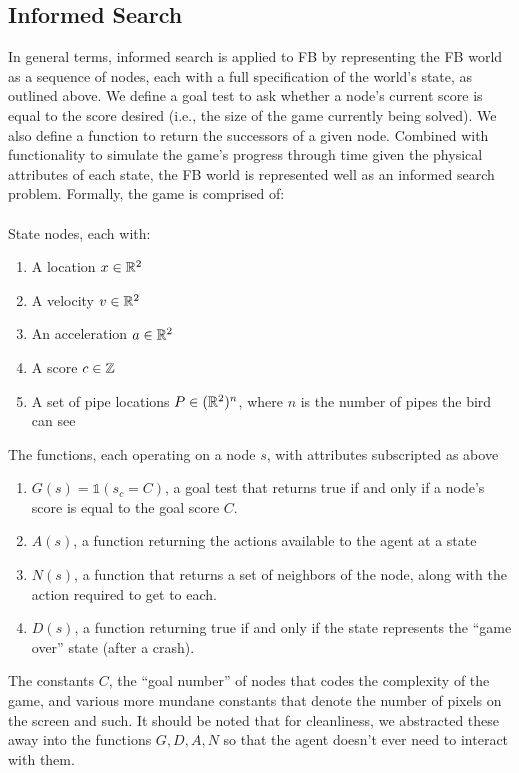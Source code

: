 \documentclass[11pt]{article}
\begin{document}
\subsection{Informed Search}
In general terms, informed search is applied to FB by representing the FB
world as a sequence of nodes, each with a full specification of the world's state,
as outlined above. We define a goal test to ask whether a node's current score
is equal to the score desired (i.e., the size of the game currently being solved).
We also define a function to return the successors of a given node. Combined with
functionality to simulate the game's progress through time given the physical
attributes of each state, the FB world is represented well as an informed
search problem. Formally, the game is comprised of:
\\\\State nodes, each with:
\begin{enumerate}
    \item A location $x \in \mathbb{R}^2$
    \item A velocity $v \in \mathbb{R}^2$
    \item An acceleration $a \in \mathbb{R}^2$
    \item A score $c \in \mathbb{Z}$
    \item A set of pipe locations $P \in (\mathbb{R}^2)^n$, where $n$ is the
    number of pipes the bird can see
\end{enumerate}
The functions, each operating on a node $s$, with attributes subscripted as above
\begin{enumerate}
    \item $G(s) = \mathbb{1}(s_c = C)$, a goal test that returns true if and only if
    a node's score is equal to the goal score $C$.
    \item $A(s)$, a function returning the actions available to the agent at a state
    \item $N(s)$, a function that returns a set of neighbors of the node, along
    with the action required to get to each.
    \item $D(s)$, a function returning true if and only if the state represents the
    ``game over'' state (after a crash).
\end{enumerate}
The constants $C$, the ``goal number'' of nodes that codes the complexity of the
game, and various more mundane constants that denote the number of pixels on the screen
and such. It should be noted that for cleanliness, we abstracted these away into the
functions $G, D, A, N$ so that the agent doesn't ever need to interact with them.
\end{document}
